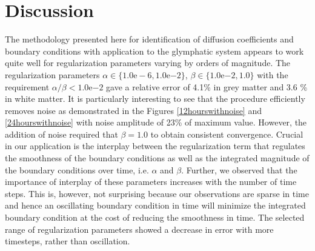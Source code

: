 \documentclass[11pt,a4paper]{article}
\begin{document}
%
% 

\section{Discussion}
The methodology presented here for identification of diffusion coefficients and boundary conditions with application to the glymphatic system appears to work quite 
well for regularization parameters varying by orders of magnitude. The regularization parameters  $\alpha \in \lbrace 1.0\mathrm{e-6}, 1.0\mathrm{e}{-2} \rbrace$, $\beta \in \lbrace 1.0\mathrm{e}{-2} , 1.0 \rbrace$ with the requirement $\alpha / \beta < 1.0\mathrm{e}{-2}$ gave a relative error of  
4.1\% in grey matter and 3.6 \% in white matter. It is particularly interesting to see that the procedure efficiently removes noise as demonstrated
in the Figures \ref{12hourswithnoise} and \ref{24hourswithnoise} with noise amplitude of 23\% of maximum value. However, the addition of noise required that $\beta = 1.0 $ to obtain consistent convergence. 
Crucial in our application is the interplay between the regularization term that regulates the smoothness of the boundary conditions as well as the integrated magnitude of the boundary conditions over time, i.e. $\alpha$ and $\beta$. Further, we observed that the importance of interplay of these parameters increases with the number of time steps. This is, however, not surprising because our observations are sparse
in time and hence an oscillating boundary condition in time will minimize the integrated boundary condition at the cost of reducing the smoothness in time. The selected range of regularization parameters showed a decrease in error with more timesteps, rather than oscillation.     
\end{document}
